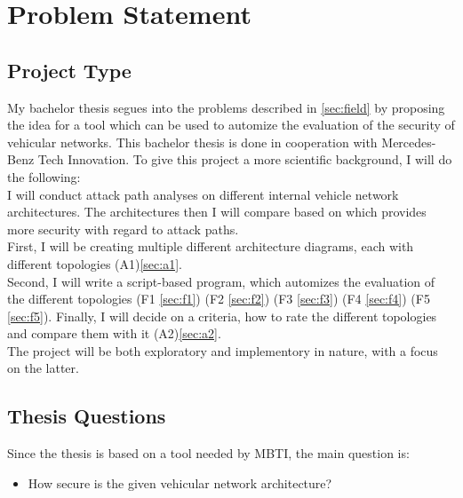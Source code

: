 
\chapter{Problem Statement}
\label{sec:problem}

\section{Project Type}\label{sec:type}

My bachelor thesis segues into the problems described in \ref{sec:field} by proposing the idea for a tool which can be used to automize the evaluation of the security of vehicular networks.
This bachelor thesis is done in cooperation with Mercedes-Benz Tech Innovation.
To give this project a more scientific background, I will do the following: \\

I will conduct attack path analyses on different internal vehicle network architectures.
The architectures then I will compare based on which provides more security with regard to attack paths.\\

First, I will be creating multiple different architecture diagrams, each with different topologies (A1)\ref{sec:a1}.\\
Second, I will write a script-based program, which automizes the evaluation of the different topologies 
(F1 \ref{sec:f1})
(F2 \ref{sec:f2})
(F3 \ref{sec:f3})
(F4 \ref{sec:f4})
(F5 \ref{sec:f5}).
Finally, I will decide on a criteria, how to rate the different topologies and compare them with it (A2)\ref{sec:a2}.\\

The project will be both exploratory and implementory in nature, with a focus on the latter.


\section{Thesis Questions}\label{sec:questions}

Since the thesis is based on a tool needed by MBTI, the main question is:\\

\begin{itemize}
    \item How secure is the given vehicular network architecture?
\end{itemize}

